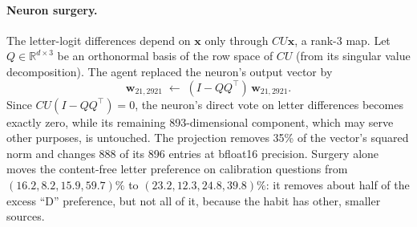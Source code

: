 \documentclass[11pt]{article}
\newcommand{\R}{\mathbb{R}}
\newcommand{\vect}[1]{\boldsymbol{#1}}
\begin{document}
\paragraph{Neuron surgery.} The letter-logit differences depend on $\vect{x}$ only through $CU\vect{x}$, a rank-3 map. Let $Q\in\R^{d\times3}$ be an orthonormal basis of the row space of $CU$ (from its singular value decomposition). The agent replaced the neuron's output vector by
\begin{equation}
\vect{w}_{21,2921}\;\leftarrow\;(I-QQ^\top)\,\vect{w}_{21,2921}.
\end{equation}
Since $CU(I-QQ^\top)=0$, the neuron's direct vote on letter differences becomes exactly zero, while its remaining 893-dimensional component, which may serve other purposes, is untouched. The projection removes 35\% of the vector's squared norm and changes 888 of its 896 entries at bfloat16 precision. Surgery alone moves the content-free letter preference on calibration questions from $(16.2, 8.2, 15.9, 59.7)\%$ to $(23.2, 12.3, 24.8, 39.8)\%$: it removes about half of the excess ``D'' preference, but not all of it, because the habit has other, smaller sources.
\end{document}
